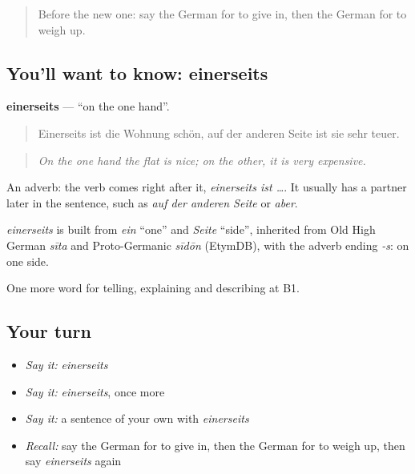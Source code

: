 \begin{quote}
Before the new one: say the German for to give in, then the German for to weigh up.
\end{quote}

\subsection*{You'll want to know: einerseits}
\textbf{einerseits} — \textquotedblleft{}on the one hand\textquotedblright{}.

\begin{quote}
Einerseits ist die Wohnung schön, auf der anderen Seite ist sie sehr teuer.
\end{quote}

\begin{quote}
\emph{On the one hand the flat is nice; on the other, it is very expensive.}
\end{quote}

An adverb: the verb comes right after it, \emph{einerseits ist …}. It usually has a partner later in the sentence, such as \emph{auf der anderen Seite} or \emph{aber}.

\begin{cousinweb}
\emph{einerseits} is built from \emph{ein} \textquotedblleft{}one\textquotedblright{} and \emph{Seite} \textquotedblleft{}side\textquotedblright{}, inherited from Old High German \emph{sīta} and Proto-Germanic \emph{sīdōn} (EtymDB), with the adverb ending \emph{-s}: on one side.
\end{cousinweb}

\begin{grammarlens}[title={What you've built}]
One more word for telling, explaining and describing at B1.
\end{grammarlens}

\subsection*{Your turn}
\begin{itemize}
\raggedright
  \item \emph{Say it:} \emph{einerseits}
  \item \emph{Say it:} \emph{einerseits}, once more
  \item \emph{Say it:} a sentence of your own with \emph{einerseits}
  \item \emph{Recall:} say the German for to give in, then the German for to weigh up, then say \emph{einerseits} again
\end{itemize}

